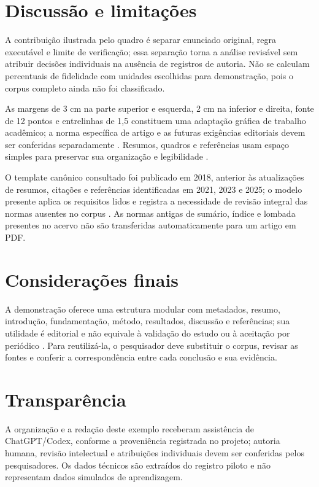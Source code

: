 \section{Discussão e limitações}
A contribuição ilustrada pelo quadro é separar enunciado original, regra executável e limite de verificação; essa separação torna a análise revisável sem atribuir decisões individuais na ausência de registros de autoria. Não se calculam percentuais de fidelidade com unidades escolhidas para demonstração, pois o corpus completo ainda não foi classificado.

As margens de 3 cm na parte superior e esquerda, 2 cm na inferior e direita, fonte de 12 pontos e entrelinhas de 1,5 constituem uma adaptação gráfica de trabalho acadêmico; a norma específica de artigo e as futuras exigências editoriais devem ser conferidas separadamente \citep{abnt2024,ufes2026}. Resumos, quadros e referências usam espaço simples para preservar sua organização e legibilidade \citep{abnt2024}.

O template canônico consultado foi publicado em 2018, anterior às atualizações de resumos, citações e referências identificadas em 2021, 2023 e 2025; o modelo presente aplica os requisitos lidos e registra a necessidade de revisão integral das normas ausentes no corpus \citep{abntex2018,ufes2026}. As normas antigas de sumário, índice e lombada presentes no acervo não são transferidas automaticamente para um artigo em PDF.

\section{Considerações finais}
A demonstração oferece uma estrutura modular com metadados, resumo, introdução, fundamentação, método, resultados, discussão e referências; sua utilidade é editorial e não equivale à validação do estudo ou à aceitação por periódico \citep{abntex2018}. Para reutilizá-la, o pesquisador deve substituir o corpus, revisar as fontes e conferir a correspondência entre cada conclusão e sua evidência.

\section*{\centering Transparência}
A organização e a redação deste exemplo receberam assistência de ChatGPT/Codex, conforme a proveniência registrada no projeto; autoria humana, revisão intelectual e atribuições individuais devem ser conferidas pelos pesquisadores. Os dados técnicos são extraídos do registro piloto e não representam dados simulados de aprendizagem.

